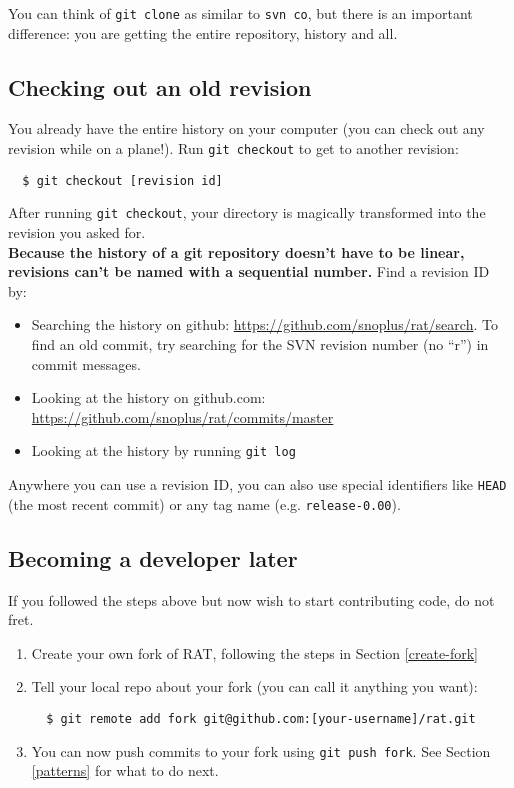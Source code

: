 \documentclass{article}
\begin{document}
You can think of {\tt git clone} as similar to {\tt svn co}, but there is an important difference: you are getting the entire repository, history and all.

\subsection{Checking out an old revision}
You already have the entire history on your computer (you can check out any revision while on a plane!). Run {\tt git checkout} to get to another revision:
\begin{verbatim}
  $ git checkout [revision id]
\end{verbatim}
After running {\tt git checkout}, your directory is magically transformed into the revision you asked for.\\

{\bf Because the history of a git repository doesn't have to be linear, revisions can't be named with a sequential number.} Find a revision ID by:
\begin{itemize}
\item Searching the history on github: \href{https://github.com/snoplus/rat/search}{https://github.com/snoplus/rat/search}. To find an old commit, try searching for the SVN revision number (no ``r'') in commit messages.
\item Looking at the history on github.com: \href{https://github.com/snoplus/rat/commits/master}{https://github.com/snoplus/rat/commits/master}
\item Looking at the history by running {\tt git log}
\end{itemize}

Anywhere you can use a revision ID, you can also use special identifiers like {\tt HEAD} (the most recent commit) or any tag name (e.g. {\tt release-0.00}).

\subsection{Becoming a developer later}
If you followed the steps above but now wish to start contributing code, do not fret.
\begin{enumerate}
\item Create your own fork of RAT, following the steps in Section \ref{create-fork}
\item Tell your local repo about your fork (you can call it anything you want):
\begin{verbatim}
  $ git remote add fork git@github.com:[your-username]/rat.git
\end{verbatim}
\item You can now push commits to your fork using {\tt git push fork}. See Section \ref{patterns} for what to do next.
\end{enumerate}
\end{document}
